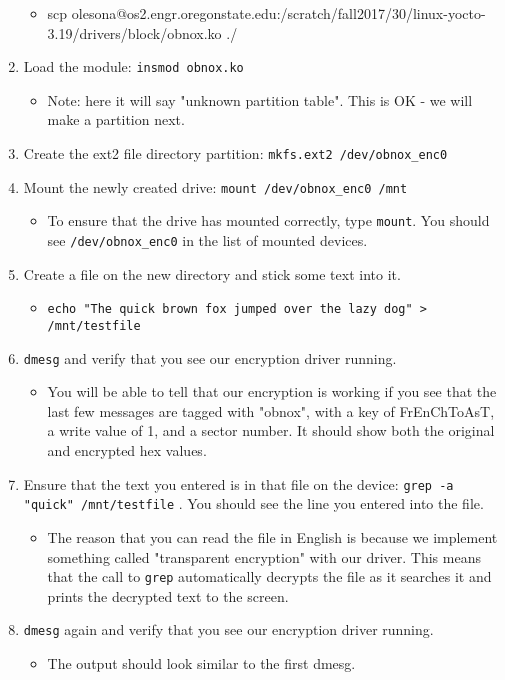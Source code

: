 \documentclass[letterpaper,10pt,titlepage]{article}
\begin{document}
\begin{enumerate}
    \begin{itemize}
    	\item scp olesona@os2.engr.oregonstate.edu:/scratch/fall2017/30/linux-yocto-3.19/drivers/block/obnox.ko ./
    \end{itemize}
    \item Load the module: \verb|insmod obnox.ko|
    \begin{itemize}
    	\item Note: here it will say "unknown partition table". This is OK - we will make a partition next.
    \end{itemize}
    \item Create the ext2 file directory partition: \verb|mkfs.ext2 /dev/obnox_enc0|
    \item Mount the newly created drive: \verb|mount /dev/obnox_enc0 /mnt|
    \begin{itemize}
    	\item To ensure that the drive has mounted correctly, type \verb|mount|. You should see \verb|/dev/obnox_enc0| in the list of mounted devices.
    \end{itemize}
    \item Create a file on the new directory and stick some text into it.
    \begin{itemize}
    \item \verb|echo "The quick brown fox jumped over the lazy dog" > /mnt/testfile|
    \end{itemize}
    \item \verb|dmesg| and verify that you see our encryption driver running.
    \begin{itemize}
    	\item You will be able to tell that our encryption is working if you see that the last few messages are tagged with "obnox", with a key of FrEnChToAsT, a write value of 1, and a sector number. It should show both the original and encrypted hex values. 
    \end{itemize}
    \item Ensure that the text you entered is in that file on the device: \verb|grep -a "quick" /mnt/testfile| . You should see the line you entered into the file.
    \begin{itemize}
    	\item The reason that you can read the file in English is because we implement something called "transparent encryption" with our driver. This means that the call to \verb|grep| automatically decrypts the file as it searches it and prints the decrypted text to the screen.
    \end{itemize}
    \item \verb|dmesg| again and verify that you see our encryption driver running.
    \begin{itemize}
    	\item The output should look similar to the first dmesg.
    \end{itemize}
\end{enumerate}
\end{document}
